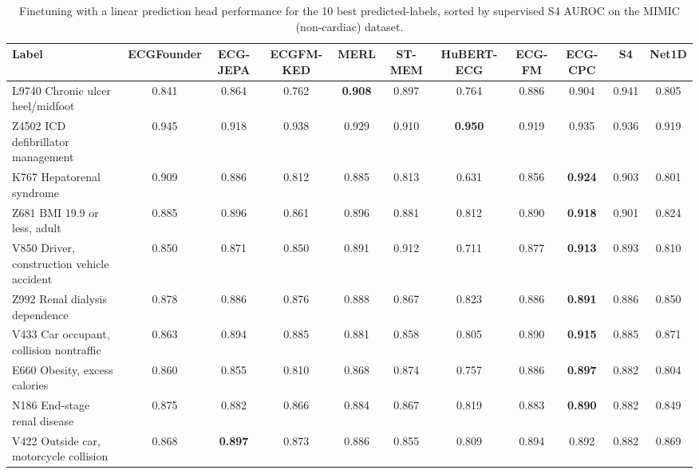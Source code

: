 \documentclass{article}
\begin{document}
                \begin{table}[htbp]
                    \centering
                    \tiny
                    \setlength{\tabcolsep}{2pt}
                    \caption{Finetuning with a linear prediction head performance for the 10 best predicted-labels, sorted by supervised S4 AUROC on the MIMIC (non-cardiac) dataset.}
                    \begin{tabular}{lcccccccccc}
                        \toprule
                        \textbf{Label} & \textbf{ECGFounder} & \textbf{ECG-JEPA} & \textbf{ECGFM-KED} & \textbf{MERL} & \textbf{ST-MEM} & \textbf{HuBERT-ECG} & \textbf{ECG-FM} & \textbf{ECG-CPC} & \textbf{S4} & \textbf{Net1D} \\
                        \midrule
                        L9740 Chronic ulcer heel/midfoot & 0.841 & 0.864 & 0.762 & \textbf{0.908} & 0.897 & 0.764 & 0.886 & 0.904 & 0.941 & 0.805 \\
                        Z4502 ICD defibrillator management & 0.945 & 0.918 & 0.938 & 0.929 & 0.910 & \textbf{0.950} & 0.919 & 0.935 & 0.936 & 0.919 \\
                        K767 Hepatorenal syndrome & 0.909 & 0.886 & 0.812 & 0.885 & 0.813 & 0.631 & 0.856 & \textbf{0.924} & 0.903 & 0.801 \\
                        Z681 BMI 19.9 or less, adult & 0.885 & 0.896 & 0.861 & 0.896 & 0.881 & 0.812 & 0.890 & \textbf{0.918} & 0.901 & 0.824 \\
                        V850 Driver, construction vehicle accident & 0.850 & 0.871 & 0.850 & 0.891 & 0.912 & 0.711 & 0.877 & \textbf{0.913} & 0.893 & 0.810 \\
                        Z992 Renal dialysis dependence & 0.878 & 0.886 & 0.876 & 0.888 & 0.867 & 0.823 & 0.886 & \textbf{0.891} & 0.886 & 0.850 \\
                        V433 Car occupant, collision nontraffic & 0.863 & 0.894 & 0.885 & 0.881 & 0.858 & 0.805 & 0.890 & \textbf{0.915} & 0.885 & 0.871 \\
                        E660 Obesity, excess calories & 0.860 & 0.855 & 0.810 & 0.868 & 0.874 & 0.757 & 0.886 & \textbf{0.897} & 0.882 & 0.804 \\
                        N186 End-stage renal disease & 0.875 & 0.882 & 0.866 & 0.884 & 0.867 & 0.819 & 0.883 & \textbf{0.890} & 0.882 & 0.849 \\
                        V422 Outside car, motorcycle collision & 0.868 & \textbf{0.897} & 0.873 & 0.886 & 0.855 & 0.809 & 0.894 & 0.892 & 0.882 & 0.869 \\
                        \bottomrule
                    \end{tabular}
                    \label{tab:results_overview_noncardiac}
                \end{table}
                
\end{document}
